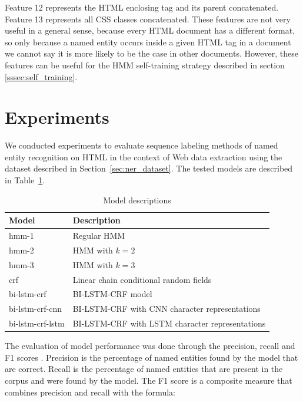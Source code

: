 \documentclass{nle}
\begin{document}
Feature 12 represents the HTML enclosing tag and its parent concatenated. Feature 13
represents all CSS classes concatenated. These features are not very useful in a general
sense, because every HTML document has a different format, so only because a named entity
occurs inside a given HTML tag in a document we cannot say it is more likely to be the case 
in other documents. However, these features can be useful for the HMM self-training strategy 
described in section \ref{sssec:self_training}. 

\section{Experiments}

We conducted experiments to evaluate sequence labeling methods of named entity 
recognition on HTML in the context of Web data extraction using the dataset 
described in Section~\ref{sec:ner_dataset}. The tested models are described in
Table~\ref{tab:models}.

\begin{table}[h]
  \small
  \begin{center}
    \begin{tabular}{ ll }
      \toprule
      Model & Description \\
      \midrule
      hmm-1            & Regular HMM \\
      hmm-2            & HMM with $ k=2 $ \\
      hmm-3            & HMM with $ k=3 $ \\
      crf              & Linear chain conditional random fields \\
      bi-lstm-crf      & BI-LSTM-CRF model \\
      bi-lstm-crf-cnn  & BI-LSTM-CRF with CNN character representations \\
      bi-lstm-crf-lstm & BI-LSTM-CRF with LSTM character representations \\
      \bottomrule
    \end{tabular}
  \end{center}
  \caption{Model descriptions}
  \label{tab:models}
\end{table}

The evaluation of model performance was done through the precision, recall and 
F1 scores \cite{Rijsbergen1979}. Precision is the percentage of named entities found by 
the model that are correct. Recall is the percentage of named entities that are present
in the corpus and were found by the model. The F1 score is a composite measure that combines
precision and recall with the formula:
\end{document}
